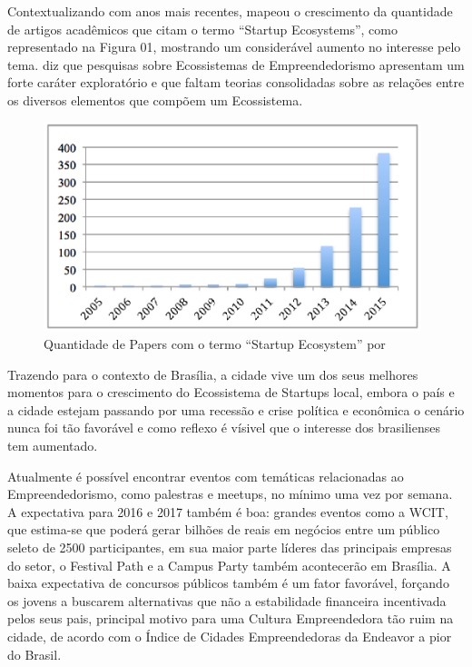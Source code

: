 Contextualizando com anos mais recentes,  mapeou o crescimento da quantidade de artigos acadêmicos que citam o termo ``Startup Ecosystems'', como representado na Figura 01, mostrando um considerável aumento no interesse pelo tema.  diz que pesquisas sobre Ecossistemas de Empreendedorismo apresentam um forte caráter exploratório e que faltam teorias consolidadas sobre as relações entre os diversos elementos que compõem um Ecossistema. 

\begin{figure}[!htb]
	\centering
	\includegraphics[width=11cm,angle=0]{figuras/papers_about_startup_ecosystems}
	\caption{Quantidade de Papers com o termo ``Startup Ecosystem'' por }
	\label{figure:papers_about_startup_ecosystems}
\end{figure}

Trazendo para o contexto de Brasília, a cidade vive um dos seus melhores momentos para o crescimento do Ecossistema de Startups local, embora o país e a cidade estejam passando por uma recessão e crise política e econômica o cenário nunca foi tão favorável e como reflexo é vísivel que o interesse dos brasilienses tem aumentado.

Atualmente é possível encontrar eventos com temáticas relacionadas ao Empreendedorismo, como palestras e meetups, no mínimo uma vez por semana. A expectativa para 2016 e 2017 também é boa: grandes eventos como a WCIT, que estima-se que poderá gerar bilhões de reais em negócios entre um público seleto de 2500 participantes, em sua maior parte líderes das principais empresas do setor, o Festival Path e a Campus Party também acontecerão em Brasília. A baixa expectativa de concursos públicos também é um fator favorável, forçando os jovens a buscarem alternativas que não a estabilidade financeira incentivada pelos seus pais, principal motivo para uma Cultura Empreendedora tão ruim na cidade, de acordo com o Índice de Cidades Empreendedoras da Endeavor a pior do Brasil.

